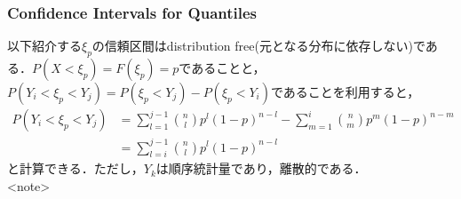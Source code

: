 \documentclass[11pt, a4paper]{jsarticle}
\begin{document}
\subsubsection{Confidence Intervals for Quantiles}
以下紹介する$\xi_p$の信頼区間はdistribution free(元となる分布に依存しない)である．$P(X < \xi_p) = F(\xi_p) = p$であることと，$P(Y_i < \xi_p < Y_j) = P(\xi_p < Y_j) - P(\xi_p < Y_i)$であることを利用すると，
\begin{align*}
P(Y_i < \xi_p < Y_j) &= \sum_{l = 1}^{j-1}\binom{n}{l}p^l(1-p)^{n-l} - \sum_{m = 1}^i\binom{n}{m}p^m(1-p)^{n-m}\\
&= \sum_{l = i}^{j-1}\binom{n}{l}p^l(1-p)^{n-l}
\end{align*}
と計算できる．ただし，$Y_k$は順序統計量であり，離散的である．\\
<note>
\end{document}

